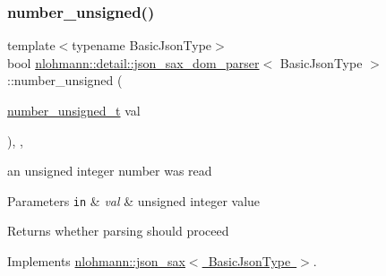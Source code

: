\subsubsection{\texorpdfstring{number\+\_\+unsigned()}{number\_unsigned()}}
{\footnotesize\ttfamily template$<$typename Basic\+Json\+Type$>$ \\
bool \mbox{\hyperlink{classnlohmann_1_1detail_1_1json__sax__dom__parser}{nlohmann\+::detail\+::json\+\_\+sax\+\_\+dom\+\_\+parser}}$<$ Basic\+Json\+Type $>$\+::number\+\_\+unsigned (\begin{DoxyParamCaption}\item[{\mbox{\hyperlink{structnlohmann_1_1json__sax_a32028cc056ae0f43aaae331cdbbbf856}{number\+\_\+unsigned\+\_\+t}}}]{val }\end{DoxyParamCaption})\hspace{0.3cm}{\ttfamily [inline]}, {\ttfamily [override]}, {\ttfamily [virtual]}}



an unsigned integer number was read 


\begin{DoxyParams}[1]{Parameters}
\mbox{\tt in}  & {\em val} & unsigned integer value \\
\hline
\end{DoxyParams}
\begin{DoxyReturn}{Returns}
whether parsing should proceed 
\end{DoxyReturn}


Implements \mbox{\hyperlink{structnlohmann_1_1json__sax_ad9b253083e0509923ba195136f49face}{nlohmann\+::json\+\_\+sax$<$ Basic\+Json\+Type $>$}}.

\mbox{\label{classnlohmann_1_1detail_1_1json__sax__dom__parser_a4a9299efaa11deed7d5d1758de2602f8}} 
